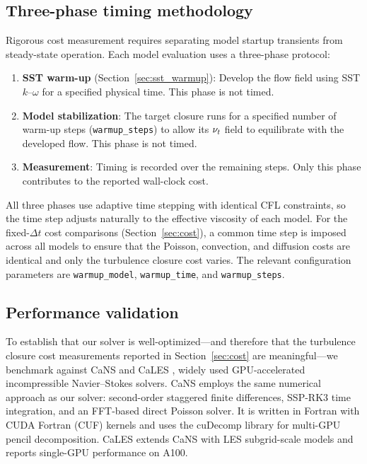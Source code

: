 \subsection{Three-phase timing methodology}
\label{sec:timing_methodology}

Rigorous cost measurement requires separating model startup transients from steady-state operation.
Each model evaluation uses a three-phase protocol:
\begin{enumerate}
    \item \textbf{SST warm-up} (Section~\ref{sec:sst_warmup}): Develop the flow field using SST $k$--$\omega$ for a specified physical time. This phase is not timed.
    \item \textbf{Model stabilization}: The target closure runs for a specified number of warm-up steps (\texttt{warmup\_steps}) to allow its $\nu_t$ field to equilibrate with the developed flow. This phase is not timed.
    \item \textbf{Measurement}: Timing is recorded over the remaining steps. Only this phase contributes to the reported wall-clock cost.
\end{enumerate}
All three phases use adaptive time stepping with identical CFL constraints, so the time step adjusts naturally to the effective viscosity of each model.
For the fixed-$\Delta t$ cost comparisons (Section~\ref{sec:cost}), a common time step is imposed across all models to ensure that the Poisson, convection, and diffusion costs are identical and only the turbulence closure cost varies.
The relevant configuration parameters are \texttt{warmup\_model}, \texttt{warmup\_time}, and \texttt{warmup\_steps}.

\subsection{Performance validation}
\label{sec:perf_validation}

To establish that our solver is well-optimized---and therefore that the turbulence closure cost measurements reported in Section~\ref{sec:cost} are meaningful---we benchmark against CaNS \citep{Costa2018} and CaLES \citep{Xiao2024}, widely used GPU-accelerated incompressible Navier--Stokes solvers.
CaNS employs the same numerical approach as our solver: second-order staggered finite differences, SSP-RK3 time integration, and an FFT-based direct Poisson solver.
It is written in Fortran with CUDA Fortran (CUF) kernels and uses the cuDecomp library for multi-GPU pencil decomposition.
CaLES extends CaNS with LES subgrid-scale models and reports single-GPU performance on A100.

